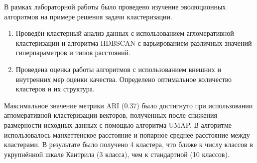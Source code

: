 
В рамках лабораторной работы было проведено изучение эволюционных алгоритмов на примере решения задачи кластеризации.

\begin{enumerate}[label*=\arabic*.]
	\item Проведён кластерный анализ данных с использованием агломеративной кластеризации и алгоритма HDBSCAN с варьированием различных значений гиперпараметров и типов расстояний.
	\item  Проведена оценка работы алгоритмов с использованием внешних и внутренних мер оценки качества. Определено оптимальное количество кластеров и их структура.
\end{enumerate}

Максимальное значение метрики ARI (0.37) было достигнуто при использовании агломеративной кластеризации векторов, полученных после снижения размерности исходных данных с помощью алгоритма UMAP. В алгоритме использовалось манхеттенское расстояние и попарное среднее расстояние между кластерами. В результате было получено 4 кластера, что ближе к числу классов в укрупнённой шкале Кантрила (3 класса), чем к стандартной (10 классов).
